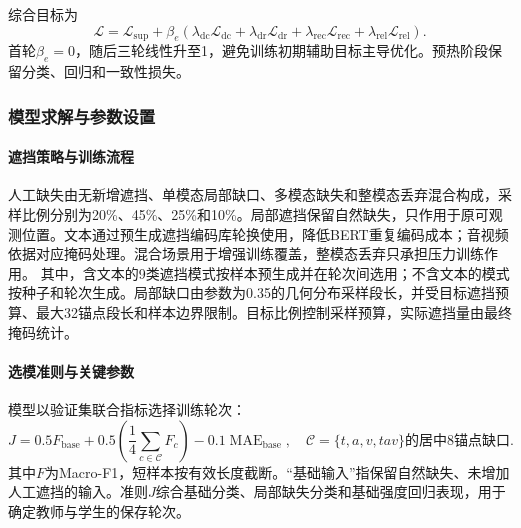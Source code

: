 综合目标为
\begin{equation}
\label{q2:eq:total_loss}
\mathcal L=\mathcal L_{\mathrm{sup}}+\beta_e\left(
\lambda_{\mathrm{dc}}\mathcal L_{\mathrm{dc}}+
\lambda_{\mathrm{dr}}\mathcal L_{\mathrm{dr}}+
\lambda_{\mathrm{rec}}\mathcal L_{\mathrm{rec}}+
\lambda_{\mathrm{rel}}\mathcal L_{\mathrm{rel}}\right).
\end{equation}
首轮$\beta_e=0$，随后三轮线性升至1，避免训练初期辅助目标主导优化。预热阶段保留分类、回归和一致性损失。

\subsubsection{模型求解与参数设置}
\paragraph{遮挡策略与训练流程}
人工缺失由无新增遮挡、单模态局部缺口、多模态缺失和整模态丢弃混合构成，采样比例分别为20\%、45\%、25\%和10\%。局部遮挡保留自然缺失，只作用于原可观测位置。文本通过预生成遮挡编码库轮换使用，降低BERT重复编码成本；音视频依据对应掩码处理。混合场景用于增强训练覆盖，整模态丢弃只承担压力训练作用。
其中，含文本的9类遮挡模式按样本预生成并在轮次间选用；不含文本的模式按种子和轮次生成。局部缺口由参数为0.35的几何分布采样段长，并受目标遮挡预算、最大32锚点段长和样本边界限制。目标比例控制采样预算，实际遮挡量由最终掩码统计。

\paragraph{选模准则与关键参数}
模型以验证集联合指标选择训练轮次：
\begin{equation}
J=0.5F_{\mathrm{base}}+0.5\left(\frac14\sum_{c\in\mathcal C}F_c\right)
-0.1\operatorname{MAE}_{\mathrm{base}},\quad
\mathcal C=\{t,a,v,tav\}\text{的居中8锚点缺口}.
\end{equation}
其中$F$为Macro-F1，短样本按有效长度截断。“基础输入”指保留自然缺失、未增加人工遮挡的输入。准则$J$综合基础分类、局部缺失分类和基础强度回归表现，用于确定教师与学生的保存轮次。

